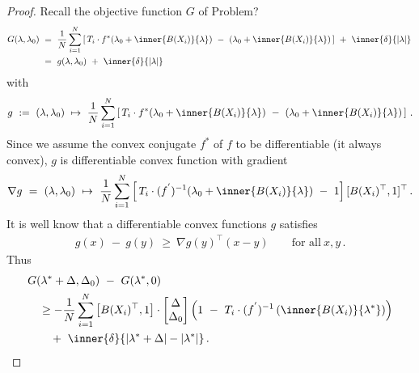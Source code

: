  \begin{proof}
  Recall the objective function $G$ of Problem? 
\begin{align*}
  G(\lambda,\lambda_0)
  &
  \ 
  =
  \ 
    \frac{1}{N}
\sum_{i=1} 
  ^N
  \left[ 
    \,
  T_i
  \cdot
  f^*
  \!
  \left( 
\lambda_0
+
\inner
{B(X_i)}
{\lambda}
  \right)
  \ 
-
\ 
  \left( 
\lambda_0
+
\inner
{B(X_i)}
{\lambda}
  \right)
  \,
  \right]
  \ 
+
\ 
\inner
{\delta}
{|\lambda|}
\,
\\
  &
\ 
=
\ 
g(\lambda,\lambda_0)
\ 
+
\ 
\inner
{\delta}
{|\lambda|}
\,
\end{align*}
with
  \begin{gather}
    g
    \ 
    := 
    \ 
    (\lambda,\lambda_0)
    \ 
    \mapsto
    \ 
    \frac{1}{N}
\sum_{i=1} 
  ^N
  \left[ 
    \,
  T_i
  \cdot
  f^*
  \!
  \left( 
\lambda_0
+
\inner
{B(X_i)}
{\lambda}
  \right)
  \ 
-
\ 
  \left( 
\lambda_0
+
\inner
{B(X_i)}
{\lambda}
  \right)
  \,
  \right]
  \,.
  \end{gather}
   Since we assume the convex conjugate $f^*$ of $f$ to be differentiable
   (it always convex),
   $g$ is differentiable convex function with gradient 
  \begin{gather*}
    \nabla
    g
    \ 
    =
    \ 
    (\lambda,\lambda_0)
    \ 
    \mapsto
    \ 
\frac{1}{N}
\sum_{i=1} 
  ^N
  \left[ 
    \,
  T_i
  \cdot
  (f^{'})^{-1}
  \!
  \left( 
\lambda_0
+
\inner
{B(X_i)}
{\lambda}
  \right)
  \ 
-
\ 
1
  \right]
  [
  B(X_i)^\top
  ,
  1
  ]^\top
  \,.
  \end{gather*}
It is well know that a differentiable convex functions $g$ satisfies
  \begin{gather*}
    g(x)
    \ 
    -
    \ 
    g(y)
    \ 
    \ge
    \ 
    \nabla
    g(y)^\top
    (x-y)
    \qquad 
    \text{for all}\ 
    x,y\,.
  \end{gather*}
Thus 
\begin{align}
  \label{c:1}
  \begin{split}
     &
   G
     (
     \lambda^*
      +
      \Delta
      ,
     \Delta_0
     )
     \ 
     -
     \ 
     G
     (
     \lambda^*,
     0
     )
     \\
     &
     \quad
     \ge
     -
     \frac{1}{N}
     \sum_{i=1}^{N} 
     \left[ 
       B(X_i)^\top,
       1
     \right]
     \cdot
     \begin{bmatrix}
       \Delta\\
       \Delta_0
     \end{bmatrix}
     \left( 
       1
       \ 
       -
       \ 
     T_i
     \cdot
     (f^{'})^{-1}
     \left( 
       \inner
       {B(X_i)}
       {\lambda^*}
     \right)
     \right)
     \\
     &
     \qquad
     +
     \ 
     \inner
     {\delta}
     {
       |\lambda^*+\Delta|
       -
       |\lambda^*|
     }
     \,.
   \end{split}
\end{align}


\end{proof}
